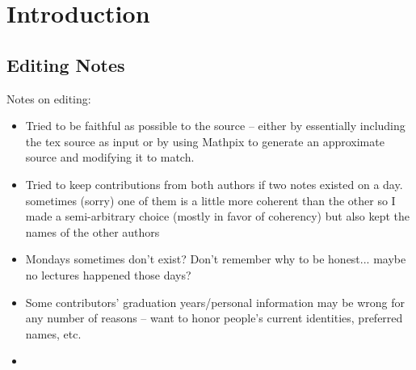 \setcounter{section}{-1}
\section{Introduction}



\subsection{Editing Notes}
Notes on editing: 
\begin{itemize}
    \item Tried to be faithful as possible to the source -- either by essentially including 
    the tex source as input or by using Mathpix to generate an approximate source and 
    modifying it to match. 
    \item Tried to keep contributions from both authors if two notes existed on a day. sometimes
    (sorry) one of them is a little more coherent than the other so I made a semi-arbitrary choice
    (mostly in favor of coherency) but also kept the names of the other authors
    \item Mondays sometimes don't exist? Don't remember why to be honest... maybe no lectures happened those days? 
    \item Some contributors' graduation years/personal information may be wrong for any number of reasons 
    -- 
    want to honor people's current identities, preferred names, etc. 
    \item 
\end{itemize}